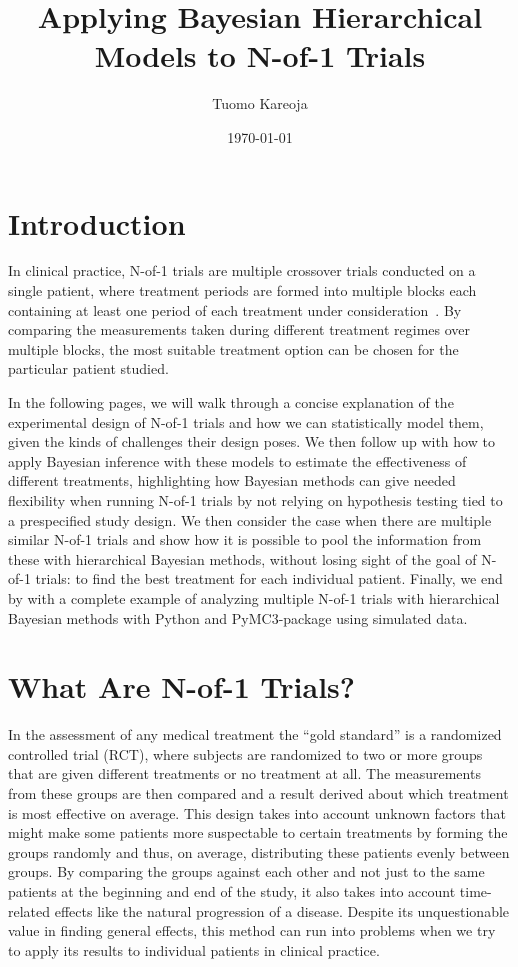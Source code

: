 \documentclass[12pt,a4paper,leqno]{report}
\title{Applying Bayesian Hierarchical Models to N-of-1 Trials}
\author{Tuomo Kareoja}
\date{\today}
\theoremstyle{plain}
\theoremstyle{definition}
\theoremstyle{remark}
\begin{document}
\maketitle

\tableofcontents

\chapter*{Introduction}\label{intro}

In clinical practice, N-of-1 trials are multiple crossover trials conducted on a
single patient, where treatment periods are formed into multiple blocks each
containing at least one period of each treatment under
consideration\ \cite{nofone}. By comparing the measurements taken during different
treatment regimes over multiple blocks, the most suitable treatment option can
be chosen for the particular patient studied.

In the following pages, we will walk through a concise explanation of the
experimental design of N-of-1 trials and how we can statistically model them,
given the kinds of challenges their design poses. We then follow up with how to
apply Bayesian inference with these models to estimate the effectiveness of different
treatments, highlighting how Bayesian methods can give needed flexibility when
running N-of-1 trials by not relying on hypothesis testing tied to a
prespecified study design. We then consider the case when there are multiple
similar N-of-1 trials and show how it is possible to pool the information from
these with hierarchical Bayesian methods, without losing sight of the goal of
N-of-1 trials: to find the best treatment for each individual
patient. Finally, we end by with a complete example of analyzing multiple N-of-1
trials with hierarchical Bayesian methods with Python and PyMC3-package using
simulated data.

\chapter{What Are N-of-1 Trials?}\label{nof1}

In the assessment of any medical treatment the ``gold standard'' is a randomized
controlled trial (RCT), where subjects are randomized to two or more groups that
are given different treatments or no treatment at all. The measurements from
these groups are then compared and a result derived about which treatment is
most effective on average. This design takes into account unknown factors that
might make some patients more suspectable to certain treatments by forming the
groups randomly and thus, on average, distributing these patients evenly between
groups. By comparing the groups against each other and not just to the same
patients at the beginning and end of the study, it also takes into account time-related
effects like the natural progression of a disease. Despite its unquestionable value
in finding general effects, this method can run into problems when we
try to apply its results to individual patients in clinical practice.
\end{document}

